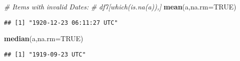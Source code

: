 \documentclass[
]{article}
\newenvironment{Shaded}{\begin{snugshade}}{\end{snugshade}}
\newcommand{\CommentTok}[1]{\textcolor[rgb]{0.56,0.35,0.01}{\textit{#1}}}
\newcommand{\DataTypeTok}[1]{\textcolor[rgb]{0.13,0.29,0.53}{#1}}
\newcommand{\KeywordTok}[1]{\textcolor[rgb]{0.13,0.29,0.53}{\textbf{#1}}}
\newcommand{\NormalTok}[1]{#1}
\newcommand{\OtherTok}[1]{\textcolor[rgb]{0.56,0.35,0.01}{#1}}
\begin{document}
\begin{Shaded}
\begin{Highlighting}[]
\CommentTok{# Items with invalid Dates:}
\CommentTok{# df7[which(is.na(a)),]}
\KeywordTok{mean}\NormalTok{(a,}\DataTypeTok{na.rm=}\OtherTok{TRUE}\NormalTok{)}
\end{Highlighting}
\end{Shaded}

\begin{verbatim}
## [1] "1920-12-23 06:11:27 UTC"
\end{verbatim}

\begin{Shaded}
\begin{Highlighting}[]
\KeywordTok{median}\NormalTok{(a,}\DataTypeTok{na.rm=}\OtherTok{TRUE}\NormalTok{)}
\end{Highlighting}
\end{Shaded}

\begin{verbatim}
## [1] "1919-09-23 UTC"
\end{verbatim}
\end{document}
